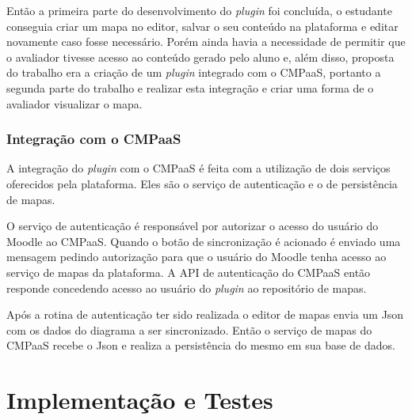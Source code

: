 \documentclass[
	12pt,				%
	openright,			%
	oneside,			%
	a4paper,			%
	english,			%
	french,				%
	spanish,			%
	brazil				%
	]{abntex2}
\begin{document}
Então a primeira parte do desenvolvimento do \textit{plugin} foi concluída, o estudante conseguia criar um mapa no editor, salvar o seu conteúdo na plataforma e editar novamente caso fosse necessário. Porém ainda havia a necessidade de permitir que o avaliador tivesse acesso ao conteúdo gerado pelo aluno e, além disso, proposta do trabalho era a criação de um \textit{plugin} integrado com o CMPaaS,  portanto a segunda parte do trabalho e realizar esta integração e criar uma forma de o avaliador visualizar o mapa.

\subsection{Integração com o CMPaaS}

A integração do \textit{plugin} com o CMPaaS é feita com a utilização de dois serviços oferecidos pela plataforma. Eles são o serviço de autenticação e o de persistência de mapas.

O serviço de autenticação é responsável por autorizar o acesso do usuário do Moodle ao CMPaaS. Quando o botão de sincronização é acionado é enviado uma mensagem pedindo autorização para que o usuário do Moodle tenha acesso ao serviço de mapas da plataforma. A API de autenticação do CMPaaS então responde concedendo acesso ao usuário do \textit{plugin} ao repositório de mapas.

Após a rotina de autenticação ter sido realizada o editor de mapas envia um Json com os dados do diagrama a ser sincronizado. Então o serviço de mapas do CMPaaS recebe o Json e realiza a persistência do mesmo em sua base de dados.



\chapter{Implementação e Testes}
\end{document}
